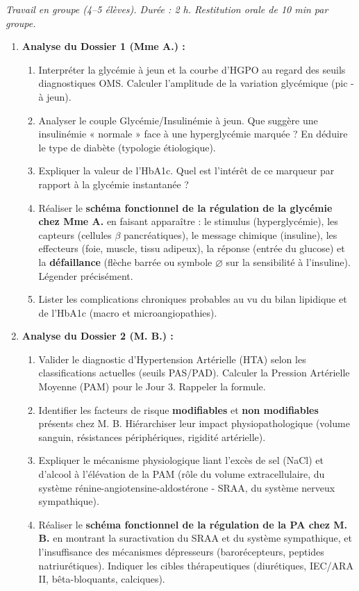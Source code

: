 \documentclass[11pt]{article}
\newcounter{popsec}
\newcounter{popsub}
\newcommand{\courssub}[1]{%
  \stepcounter{popsub}%
  \par\vspace{9pt}\noindent{\popxbold\fontsize{11.5}{13}\selectfont\color{popink}{\color{poporange}\thepopsec.\thepopsub}\hspace{6pt}#1}\par\nopagebreak\vspace{4pt}
}
\begin{document}
\courssub{Consignes}
\emph{Travail en groupe (4--5 élèves). Durée : 2 h. Restitution orale de 10 min par groupe.}
\begin{enumerate}
    \item \textbf{Analyse du Dossier 1 (Mme A.) :}
    \begin{enumerate}
        \item Interpréter la glycémie à jeun et la courbe d'HGPO au regard des seuils diagnostiques OMS. Calculer l'amplitude de la variation glycémique (pic - à jeun).
        \item Analyser le couple Glycémie/Insulinémie à jeun. Que suggère une insulinémie « normale » face à une hyperglycémie marquée ? En déduire le type de diabète (typologie étiologique).
        \item Expliquer la valeur de l'HbA1c. Quel est l'intérêt de ce marqueur par rapport à la glycémie instantanée ?
        \item Réaliser le \textbf{schéma fonctionnel de la régulation de la glycémie chez Mme A.} en faisant apparaître : le stimulus (hyperglycémie), les capteurs (cellules $\beta$ pancréatiques), le message chimique (insuline), les effecteurs (foie, muscle, tissu adipeux), la réponse (entrée du glucose) et la \textbf{défaillance} (flèche barrée ou symbole $\varnothing$ sur la sensibilité à l'insuline). Légender précisément.
        \item Lister les complications chroniques probables au vu du bilan lipidique et de l'HbA1c (macro et microangiopathies).
    \end{enumerate}
    \item \textbf{Analyse du Dossier 2 (M. B.) :}
    \begin{enumerate}
        \item Valider le diagnostic d'Hypertension Artérielle (HTA) selon les classifications actuelles (seuils PAS/PAD). Calculer la Pression Artérielle Moyenne (PAM) pour le Jour 3. Rappeler la formule.
        \item Identifier les facteurs de risque \textbf{modifiables} et \textbf{non modifiables} présents chez M. B. Hiérarchiser leur impact physiopathologique (volume sanguin, résistances périphériques, rigidité artérielle).
        \item Expliquer le mécanisme physiologique liant l'excès de sel (NaCl) et d'alcool à l'élévation de la PAM (rôle du volume extracellulaire, du système rénine-angiotensine-aldostérone - SRAA, du système nerveux sympathique).
        \item Réaliser le \textbf{schéma fonctionnel de la régulation de la PA chez M. B.} en montrant la suractivation du SRAA et du système sympathique, et l'insuffisance des mécanismes dépresseurs (barorécepteurs, peptides natriurétiques). Indiquer les cibles thérapeutiques (diurétiques, IEC/ARA II, bêta-bloquants, calciques).

\end{enumerate}
\end{enumerate}
\end{document}

